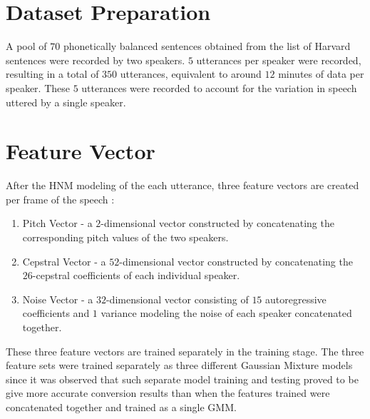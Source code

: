 \documentclass[BTech]{nitkdiss}
\begin{document}
\section{Dataset Preparation}
A pool of $70$ phonetically balanced sentences obtained from the list of Harvard sentences were recorded by two speakers. $5$ utterances per speaker were recorded, resulting in a total of $350$ utterances, equivalent to around $12$ minutes of data per speaker. These $5$ utterances were recorded to account for the variation in speech uttered by a single speaker.

\section{Feature Vector}
After the HNM modeling of the each utterance, three feature vectors are created per frame of the speech : \begin{enumerate}
\item Pitch Vector - a $2$-dimensional vector constructed by concatenating the corresponding pitch values of the two speakers. 
\item Cepstral Vector - a $52$-dimensional vector constructed by concatenating the $26$-cepstral coefficients of each individual speaker. 
\item Noise Vector - a $32$-dimensional vector consisting of $15$ autoregressive coefficients and $1$ variance modeling the noise of each speaker concatenated together.
\end{enumerate}
These three feature vectors are trained separately in the training stage. The three feature sets were trained separately as three different Gaussian Mixture models since it was observed that such separate model training and testing proved to be give more accurate conversion results than when the features trained were concatenated together and trained as a single GMM.
\end{document}
